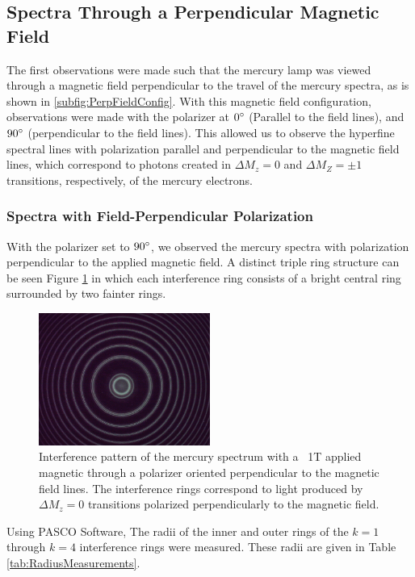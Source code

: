 \documentclass[twocolumn]{article}
\begin{document}
	\subsection{Spectra Through a Perpendicular Magnetic Field}
		The first observations were made such that the mercury lamp was viewed through a magnetic field perpendicular to the travel of the mercury spectra, as is shown in \ref{subfig:PerpFieldConfig}.
		With this magnetic field configuration, observations were made with the polarizer at $0\degree$ (Parallel to the field lines), and $90\degree$ (perpendicular to the field lines).
		This allowed us to observe the hyperfine spectral lines with polarization parallel and perpendicular to the magnetic field lines, which correspond to photons created in $\Delta M_z = 0$ and $\Delta M_Z = \pm1$ transitions, respectively, of the mercury electrons.
		\subsubsection{Spectra with Field-Perpendicular Polarization}
			
			With the polarizer set to $90\degree$, we observed the mercury spectra with polarization perpendicular to the applied magnetic field. A distinct triple ring structure can be seen Figure \ref{fig:Triplet90deg} in which each interference ring consists of a bright central ring surrounded by two fainter rings. 
			
			\begin{figure}
				\centering
				\includegraphics[width=0.5\textwidth]{Images/Run1_ParallelPolarizer}
				\caption{Interference pattern of the mercury spectrum with a ~1T applied magnetic through a polarizer oriented perpendicular to the magnetic field lines. The interference rings correspond to light produced by $\Delta M_z = 0$ transitions polarized perpendicularly to the magnetic field.}
				\label{fig:Triplet90deg}
			\end{figure}
			
			Using PASCO Software, The radii of the inner and outer rings of the $k=1$ through $k=4$ interference rings were measured.
			These radii are given in Table \ref{tab:RadiusMeasurements}.
			
\end{document}
